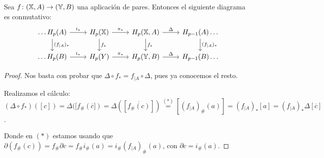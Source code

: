 \begin{proposition}
  Sea $f \colon ({\mathbb X}, A) \to ({\mathbb Y}, B)$ una aplicación de pares. Entonces el siguiente diagrama es conmutativo:
  \[  \begin{tikzcd}
    \dots H_p(A) \arrow{r}{i_*} \arrow{d}{(f_{|A})_*} & H_p(\X) \arrow{r}{\pi_*} \arrow{d}{f_*} & H_p(\X, A) \arrow{r}{\Delta} \arrow{d}{f_*} & H_{p-1}(A) \dots \arrow{d}{(f_{|A})_*} \\
    \dots H_p(B) \arrow{r}{i_*} & H_p(Y) \arrow{r}{\pi_*} & H_p(\Y, B) \arrow{r}{\Delta} & H_{p-1}(B) \dots
  \end{tikzcd} \]
\end{proposition}

\begin{proof}
  Nos basta con probar que $\Delta \circ f_* = f_{|A} \circ \Delta$, pues ya conocemos el resto.

  Realizamos el cálculo:
  \[ (\Delta \circ f_*)([c]) = \Delta([f_\#(\overline{c}]) = \Delta([\overline{f_\#(c)}]) \stackrel{(*)}{=} [(f_{|A})_\#(a)]
    = (f_{|A})_*[a] = (f_{|A})_* \Delta[\overline{c}] \].

  Donde en $(*)$ estamos usando que $\partial(f_\#(c)) = f_\# \partial c = f_\# i_\#(a) = i_\#(f_{|A})_\#(a)$, con $\partial c = i_\#(a).$
\end{proof}
